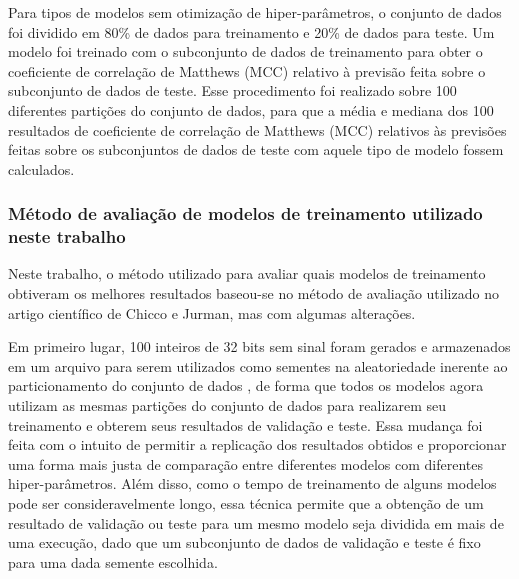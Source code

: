 Para tipos de modelos sem otimização de hiper-parâmetros, o conjunto de dados foi dividido em 80\% de dados para treinamento e 20\% de dados para teste. Um modelo foi treinado com o subconjunto de dados de treinamento para obter o coeficiente de correlação de Matthews (MCC) relativo à previsão feita sobre o subconjunto de dados de teste. Esse procedimento foi realizado sobre 100 diferentes partições do conjunto de dados, para que a média e mediana dos 100 resultados de coeficiente de correlação de Matthews (MCC) relativos às previsões feitas sobre os subconjuntos de dados de teste com aquele tipo de modelo fossem calculados.

\subsubsection{Método de avaliação de modelos de treinamento utilizado neste trabalho}

Neste trabalho, o método utilizado para avaliar quais modelos de treinamento obtiveram os melhores resultados baseou-se no método de avaliação utilizado no artigo científico de Chicco e Jurman, mas com algumas alterações.

Em primeiro lugar, 100 inteiros de 32 bits sem sinal foram gerados e armazenados em um arquivo para serem utilizados como sementes na aleatoriedade inerente ao particionamento do conjunto de dados \cite{larxel_dataset}, de forma que todos os modelos agora utilizam as mesmas partições do conjunto de dados para realizarem seu treinamento e obterem seus resultados de validação e teste. Essa mudança foi feita com o intuito de permitir a replicação dos resultados obtidos e proporcionar uma forma mais justa de comparação entre diferentes modelos com diferentes hiper-parâmetros. Além disso, como o tempo de treinamento de alguns modelos pode ser consideravelmente longo, essa técnica permite que a obtenção de um resultado de validação ou teste para um mesmo modelo seja dividida em mais de uma execução, dado que um subconjunto de dados de validação e teste é fixo para uma dada semente escolhida.

